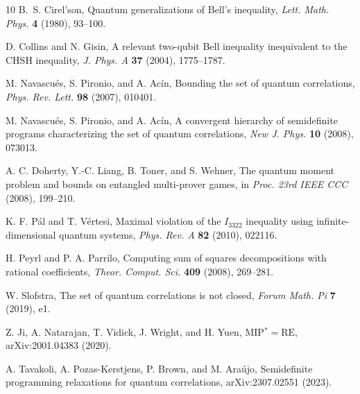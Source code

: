 \documentclass[11pt]{article}
\newcommand{\1}{\mathbb{1}}
\begin{document}
\begin{thebibliography}{10}
B.~S. Cirel'son, Quantum generalizations of Bell's inequality, \emph{Lett. Math. Phys.} \textbf{4} (1980), 93--100.

D. Collins and N. Gisin, A relevant two-qubit Bell inequality inequivalent to the CHSH inequality, \emph{J. Phys. A} \textbf{37} (2004), 1775--1787.

M. Navascu\'es, S. Pironio, and A. Ac\'in, Bounding the set of quantum correlations, \emph{Phys. Rev. Lett.} \textbf{98} (2007), 010401.

M. Navascu\'es, S. Pironio, and A. Ac\'in, A convergent hierarchy of semidefinite programs characterizing the set of quantum correlations, \emph{New J. Phys.} \textbf{10} (2008), 073013.

A. C. Doherty, Y.-C. Liang, B. Toner, and S. Wehner, The quantum moment problem and bounds on entangled multi-prover games, in \emph{Proc. 23rd IEEE CCC} (2008), 199--210.

K. F. P\'al and T. V\'ertesi, Maximal violation of the $I_{3322}$ inequality using infinite-dimensional quantum systems, \emph{Phys. Rev. A} \textbf{82} (2010), 022116.

H. Peyrl and P. A. Parrilo, Computing sum of squares decompositions with rational coefficients, \emph{Theor. Comput. Sci.} \textbf{409} (2008), 269--281.

W. Slofstra, The set of quantum correlations is not closed, \emph{Forum Math. Pi} \textbf{7} (2019), e1.

Z. Ji, A. Natarajan, T. Vidick, J. Wright, and H. Yuen, MIP$^*=\mathrm{RE}$, arXiv:2001.04383 (2020).

A. Tavakoli, A. Pozas-Kerstjens, P. Brown, and M. Ara\'ujo, Semidefinite programming relaxations for quantum correlations, arXiv:2307.02551 (2023).
\end{thebibliography}

\appendix
\end{document}
